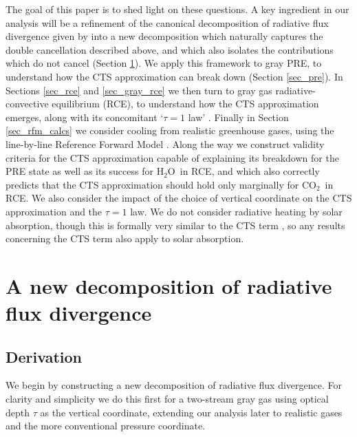 \documentclass{ametsoc}
\newcommand{\cotwo}{\ensuremath{\mathrm{CO_2}}}
\newcommand{\htwo}{\ensuremath{\mathrm{H_2O}}}
\begin{document}
The goal of this paper is to shed light on these questions.   A key ingredient in our analysis will be a refinement of the canonical decomposition of radiative flux divergence given by \cite{green1967} into a new decomposition which naturally captures the  double cancellation described above, and which also isolates the contributions which do not cancel (Section \ref{sec_new_decomp}).  We apply this framework to gray PRE, to understand how the CTS approximation can break down (Section \ref{sec_pre}).  In Sections \ref{sec_rce} and \ref{sec_gray_rce} we then turn to  gray gas radiative-convective equilibrium (RCE), to understand how the CTS approximation emerges, along with its concomitant `$\tau=1$ law' \citep{huang2014}. Finally in Section \ref{sec_rfm_calcs} we consider cooling from realistic greenhouse gases,  using the line-by-line Reference Forward Model \citep{dudhia2017}. Along the way we construct  validity criteria for the CTS approximation capable of explaining its breakdown for the PRE state as well as its success for  \htwo\ in RCE, and which also correctly predicts that the CTS approximation should hold  only marginally for \cotwo\ in RCE.  We also consider the impact of the choice of vertical coordinate  on the CTS approximation and the $\tau=1$ law. We do not consider radiative heating by solar absorption, though this is formally very similar to the CTS term \citep[e.g.][]{jeevanjee2018},  so any results concerning the CTS term also apply to solar absorption.


\section{A new decomposition of radiative flux divergence} \label{sec_new_decomp}
\subsection{Derivation} \label{sec_derivation}
We begin by constructing a new decomposition of radiative flux divergence. For clarity and simplicity we do this first for a two-stream gray gas using optical depth $\tau$ as the vertical coordinate, extending our analysis later to realistic gases and the more conventional pressure coordinate.
\end{document}

